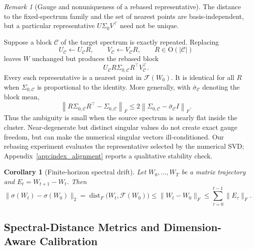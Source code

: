 \documentclass[11pt, a4paper]{utda}
\theoremstyle{plain}
\newtheorem{corollary}[theorem]{Corollary}
\theoremstyle{definition}
\theoremstyle{remark}
\newtheorem{remark}[theorem]{Remark}
\begin{document}
\begin{remark}[Gauge and nonuniqueness of a rebased representative]
\label{rem:rebasing_gauge}
The distance to the fixed-spectrum family and the set of nearest points are
basis-independent, but a particular representative $U\Sigma_0V^\top$ need not
be unique.

Suppose a block $\mathcal C$ of the target spectrum is exactly repeated.
Replacing
\[
    U_{\mathcal C}\leftarrow U_{\mathcal C}R,
    \qquad
    V_{\mathcal C}\leftarrow V_{\mathcal C}R,
    \qquad
    R\in\mathrm O(|\mathcal C|)
\]
leaves $W$ unchanged but produces the rebased block
\[
    U_{\mathcal C}
    R\Sigma_{0,\mathcal C}R^\top
    V_{\mathcal C}^\top.
\]
Every such representative is a nearest point in $\mathcal F(W_0)$. It is
identical for all $R$ when
$\Sigma_{0,\mathcal C}$ is proportional to the identity. More generally, with
$\bar\sigma_{\mathcal C}$ denoting the block mean,
\begin{equation}
\label{eq:gauge_sensitivity_bound}
    \left\|
        R\Sigma_{0,\mathcal C}R^\top-\Sigma_{0,\mathcal C}
    \right\|_F
    \leq
    2
    \left\|
        \Sigma_{0,\mathcal C}
        -
        \bar\sigma_{\mathcal C}I
    \right\|_F.
\end{equation}
Thus the ambiguity is small when the source spectrum is nearly flat inside the
cluster. Near-degenerate but distinct singular values do not create exact gauge
freedom, but can make the numerical singular vectors ill-conditioned. Our
rebasing experiment evaluates the representative selected by the numerical
SVD; Appendix~\ref{app:index_alignment} reports a qualitative stability check.
\end{remark}

\begin{corollary}[Finite-horizon spectral drift]
\label{cor:finite_horizon_spectral_drift}
Let $W_0,\ldots,W_T$ be a matrix trajectory and
$E_t=W_{t+1}-W_t$. Then
\begin{equation}
    \|\sigma(W_t)-\sigma(W_0)\|_2
    =
    \operatorname{dist}_F
    \bigl(
        W_t,\mathcal F(W_0)
    \bigr)
    \leq
    \|W_t-W_0\|_F
    \leq
    \sum_{\tau=0}^{t-1}\|E_\tau\|_F.
\end{equation}
\end{corollary}


\subsection{Spectral-Distance Metrics and Dimension-Aware Calibration}
\label{app:dimension_calibration}
\end{document}
